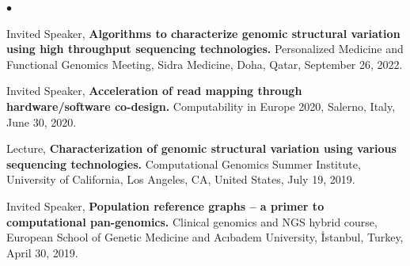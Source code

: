 \documentclass[margin,line]{res}
\newenvironment{list2}{
  \begin{list}{$\bullet$}{%
      \setlength{\itemsep}{0.1cm}
      \setlength{\parsep}{0in} \setlength{\parskip}{0in}
      \setlength{\topsep}{0in} \setlength{\partopsep}{0in} 
      \setlength{\leftmargin}{0.2in}}}{\end{list}}
\newcommand{\junk}[1]{}
\begin{document}
\begin{resume}
\begin{list2}
\junk{
\item
  Invited Speaker, 
      {\bf  Acceleration of read mapping through hardware/algorithm co-design.}
  Computational Genomics Summer Institute, University of California, Los Angeles, CA, United States,
  July 20, 2023.
}

\item
Invited Speaker, {\bf Algorithms to characterize genomic structural variation using high throughput sequencing technologies.} Personalized Medicine and Functional Genomics Meeting, Sidra Medicine, Doha, Qatar, September 26, 2022.

\junk{
\item
  Lecture, 
      {\bf  Characterization of genomic structural variation using various sequencing technologies.}
  Clinical genomics and NGS hybrid course, European School of Genetic Medicine and Acıbadem University, İstanbul, Turkey,
  October 13, 2020.
  }
 \item
 Invited Speaker,
{\bf Acceleration of read mapping through hardware/software co-design.}
Computability in Europe 2020, Salerno, Italy, June 30, 2020.

\junk{
 \item
  Invited Speaker, 
  {\bf Characterization of large-scale structural variants using Linked-Reads.}
  Biological Databases and Data Analysis Symposium, Koç University, Turkey, September 9, 2019.
  
  \item
  Invited Speaker, 
  {\bf Characterization of large-scale structural variants using Linked-Reads.} \textit{(in Turkish)}
  Data Science Summer School 2019, Sabancı University, Turkey, September 7, 2019.
  
  
  
  \item
  Conference Talk, 
  {\bf Characterization of large-scale structural variants using Linked-Reads.}
$27^{th}$ Annual
International Conference Intelligent Systems for Molecular Biology (ISMB/ECCB 2019), {\em HiTSeq Track},
Basel, Switzerland, July 23, 2019.
}

\item
  Lecture, 
      {\bf  Characterization of genomic structural variation using various sequencing technologies.}
  Computational Genomics Summer Institute, University of California, Los Angeles, CA, United States,
  July 19, 2019.


\item
Invited Speaker,
{\bf Population reference graphs – a primer to computational pan-genomics.}
 Clinical genomics and NGS hybrid course, European School of Genetic Medicine and Acıbadem University, İstanbul, Turkey, April 30, 2019.
 

\end{list2}
\end{resume}
\end{document}
